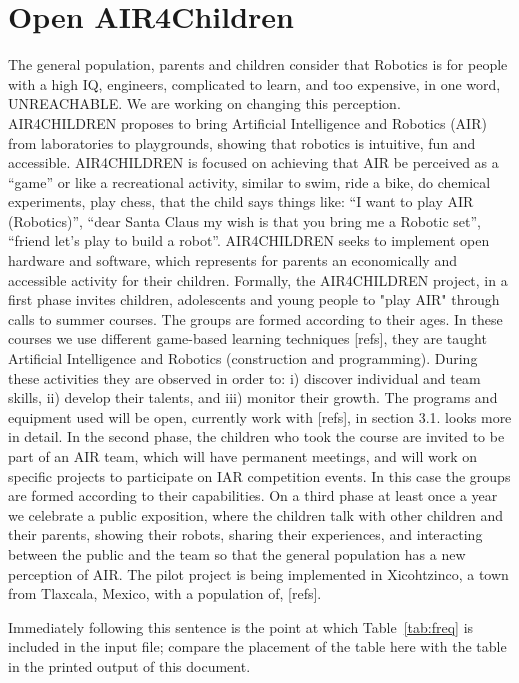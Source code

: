 \documentclass[sigconf]{acmart}
\begin{document}
\section{Open AIR4Children}
The general population, parents and children consider that Robotics is for people with a high IQ, engineers, complicated to learn, and too expensive, in one word, UNREACHABLE. We are working on changing this perception.   
AIR4CHILDREN proposes to bring Artificial Intelligence and Robotics (AIR) from laboratories to playgrounds, showing that robotics is intuitive, fun and accessible.  
AIR4CHILDREN is focused on achieving that AIR be perceived as a “game” or like a recreational activity, similar to swim, ride a bike, do chemical experiments, play chess, that the child says things like: “I want to play AIR (Robotics)”, “dear Santa Claus my wish is that you bring me a Robotic set”, “friend let's play to build a robot”.   
AIR4CHILDREN seeks to implement open hardware and software, which represents for parents an economically and accessible activity for their children.  
Formally, the AIR4CHILDREN project, in a first phase invites children, adolescents and young people to "play AIR" through calls to summer courses.   
The groups are formed according to their ages. In these courses we use different game-based learning techniques [refs], they are taught Artificial Intelligence and Robotics (construction and programming).   
During these activities they are observed in order to: i) discover individual and team skills, ii) develop their talents, and iii) monitor their growth.  
The programs and equipment used will be open, currently work with [refs], in section 3.1. looks more in detail.  
In the second phase, the children who took the course  are invited to be part of an AIR team, which will have permanent meetings, and will work on specific projects to participate on IAR competition events. In this case the groups are formed according to their capabilities.
On a third phase at least once a year we celebrate a public exposition, where the children talk with other children and their parents, showing their robots, sharing their experiences, and interacting between the public and the team so that the general population has a new perception of AIR.
The pilot project is being implemented in Xicohtzinco, a town from Tlaxcala, Mexico, with a population of, [refs].

Immediately following this sentence is the point at which
Table~\ref{tab:freq} is included in the input file; compare the
placement of the table here with the table in the printed output of
this document.
\end{document}
